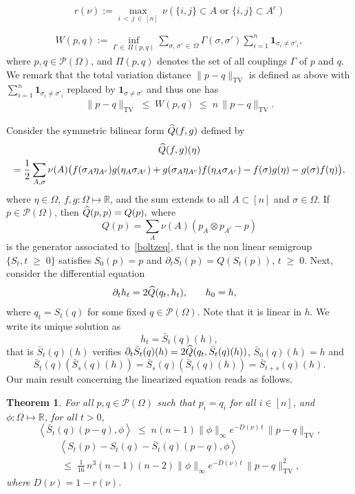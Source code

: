 \documentclass[10pt,a4paper]{article}
\newtheorem{theo}[theorem]{Theorem}
\renewcommand{\leq}{\;\leqslant\;}
\renewcommand{\geq}{\;\geqslant\;}
\newcommand{\Om}{\Omega}
\newcommand{\si}{\sigma}
\newcommand{\tv}{\mathrm{TV}}
\newcommand{\ind}{\mathbf{1}}
\newcommand{\cP}{\mathcal{P}}
\newcommand{\bbR}{\mathbb{R}}
\let\G=\Gamma
\let\O=\Omega
\let\oldhat\hat
\renewcommand*{\hat}[1]{\mathchoice{\widehat{#1}}{\widehat{#1}}{\oldhat{#1}}{\oldhat{#1}}}
\begin{document}
\begin{equation}\label{def:rnu}
r(\nu):= \max_{i\,<\,j\,\in\,[n]}\,\nu\left(\{i,j\}\subset A \text{ or }\{i,j\}\subset A^c\right)
\end{equation}

\begin{align}\label{def:W}
W(p,q):= \inf_{\G\,\in\,\Pi(p,q)}\sum_{\si,\,\si'\,\in\,\Om}\G(\si,\si')\sum_{i=1}^n\ind_{\si_i\neq\si'_i},
\end{align}
where $p,q\in\cP(\O)$, and $\Pi(p,q)$ denotes the set of all couplings $\G$ of $p$ and $q$. We remark that the total variation distance $\|p-q\|_\tv$ is defined as above with $\sum_{i=1}^n\ind_{\si_i\neq\si'_i}$ replaced by $\ind_{\si\neq\si'}$ and thus one has
\begin{align}\label{eq:tvW}
\|p-q\|_\tv\leq W(p,q) \leq n\,\|p-q\|_\tv.
\end{align}


Consider the symmetric bilinear form $\hat{Q}(f,g)$ defined by
\begin{multline}
 \hat{Q}(f,g)(\eta)\\
=
\frac{1}{2}\sum_{A,\si}
\nu(A)\big(f(\sigma_{A} \eta_{A^c}) g(\eta_{A}\sigma_{A^c}) + g(\sigma_{A} \eta_{A^c})f(\eta_{A}\sigma_{A^c}) - f(\sigma)g(\eta)- g(\sigma)f(\eta)\big),
\end{multline}
where $\eta \in \Om$, $f,g:\O\mapsto\bbR$, and the sum extends to all $A \subset [n]$ and $\si \in \O$.
If $p \in \cP(\O)$, then $\hat{Q}(p,p) = Q(p),$ where
\[
Q(p)=\sum_A\nu(A)(p_A\otimes p_{A^c} - p)
\]
is the generator associated to~\eqref{boltzeq}, that is the non linear semigroup $\{S_t, t \geq 0\}$ satisfies $S_0 (p)= p$ and $\partial_t S_t (p)= Q (S_t (p))$, $t\geq 0$.
Next, consider the differential equation
\begin{align}\label{linsem}
&\partial_t h_t = 2\hat{Q}(q_t,h_t), \ \ \ \;\;\; h_0=h,
\end{align}
where $q_t = S_t(q)$ for some fixed $ q \in \cP(\O)$. Note that it is linear in $h$.
We write its unique solution as
\[
h_t=\bar{S}_t(q)(h),
\]
that is $\bar{S}_t(q)(h)$ verifies $\partial_t \bar{S}_t(q)(h) = 2\hat{Q}(q_t,\bar{S}_t(q)(h))$, $\bar{S}_0(q)(h)=h$ and
\[
\bar{S}_t(q)(\bar{S}_s(q)(h)) = \bar{S}_s(q)(\bar{S}_t(q)(h)) = \bar{S}_{t+s}(q)(h).
\]
Our main result concerning the linearized equation reads as follows.

\begin{theo}\label{wasscontrlemma2}
For all $p,q \in \cP(\O)$ such that $p_{i} = q_{i}$ for all $i \in [n]$, and $\phi:\O\mapsto\bbR$, for all $t>0$,
\begin{equation}\label{nonlincont2}
\left\langle \bar{S}_t(q)(p-q),\phi\right\rangle  \leq n(n-1)\|\phi\|_{\infty}e^{-D(\nu) \,t}\,\|p-q\|_\tv,
\end{equation}
\begin{multline}\label{nonlincont3}
\left\langle S_t(p)-S_t(q)-\bar{S}_t(q)(p-q),\phi\right\rangle \\
\leq \frac1{16}\,n^3(n-1)(n-2) \|\phi\|_{\infty}e^{-D(\nu) \,t}\,\|p-q\|_\tv^2, 
\end{multline}
where $D(\nu)= 1-r(\nu)$.
\end{theo}
\end{document}
